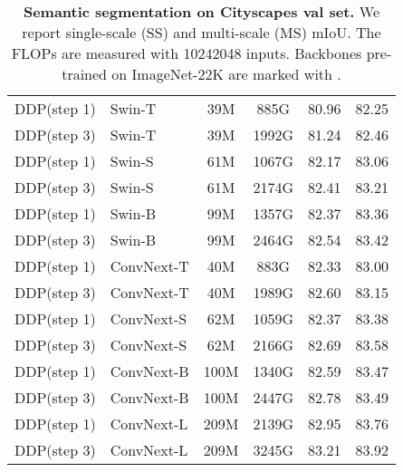 \documentclass[10pt,twocolumn,letterpaper]{article}
\newcommand{\ours}[0]{DDP\xspace}
\begin{document}
\begin{table}[t!]
\begin{tabular}{l|l|c|c|c|c}
        \hline
        \ours (step 1) & Swin-T & 39M &885G  & 80.96 & 82.25 \\
        \ours (step 3) & Swin-T & 39M &1992G & 81.24 & 82.46 \\
        \ours (step 1) & Swin-S & 61M &1067G & 82.17 & 83.06 \\
        \ours (step 3) & Swin-S & 61M &2174G & 82.41 & 83.21 \\
        \rowcolor{gray!10} 
        \ours (step 1) & Swin-B & 99M &1357G & 82.37 & 83.36 \\
        \rowcolor{gray!10} 
        \ours (step 3) & Swin-B & 99M &2464G & 82.54 & 83.42    \\   
        \hline
        \ours (step 1) & ConvNext-T  & 40M  & 883G  &82.33 & 83.00 \\
        \ours (step 3) & ConvNext-T  & 40M  & 1989G &82.60 & 83.15 \\
        \ours (step 1) & ConvNext-S  & 62M  & 1059G &82.37 & 83.38 \\
        \ours (step 3) & ConvNext-S  & 62M  & 2166G &82.69 & 83.58 \\
        \ours (step 1) & ConvNext-B  & 100M & 1340G &82.59 & 83.47 \\
        \ours (step 3) & ConvNext-B  & 100M & 2447G &82.78 & 83.49 \\
        \rowcolor{gray!10} 
        \ours (step 1) & ConvNext-L & 209M & 2139G &82.95 & 83.76 \\
        \rowcolor{gray!10} 
        \ours (step 3) & ConvNext-L & 209M & 3245G &
        83.21 & 83.92\\
    \end{tabular}
    \vspace{1em}
\caption{\textbf{Semantic segmentation on Cityscapes val set.}
We report single-scale (SS) and multi-scale (MS) mIoU.
The FLOPs are measured with 10242048 inputs.
Backbones pre-trained on ImageNet-22K are marked with .
}
\label{tab:result_cityscapes}
\end{table}
\end{document}
